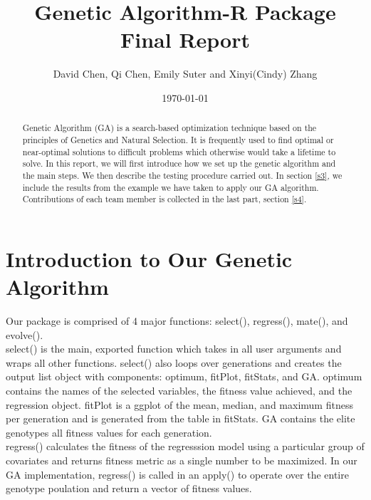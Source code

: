 \documentclass{article}
\begin{document}


\title{\LARGE Genetic Algorithm-R Package Final Report}
\author{David Chen, Qi Chen, Emily Suter and Xinyi(Cindy) Zhang}

\date{\today}

\maketitle

\begin{abstract}
Genetic Algorithm (GA) is a search-based optimization technique based on the principles of Genetics and Natural Selection. It is frequently used to find optimal or near-optimal solutions to difficult problems which otherwise would take a lifetime to solve. In this report, we will first introduce how we set up the genetic algorithm and the main steps. We then describe the testing procedure carried out. In section \ref{s3}, we include the results from the example we have taken to apply our GA algorithm. Contributions of each team member is collected in the last part, section \ref{s4}.
\end{abstract}

\newpage
\pagestyle{empty}

\section{Introduction to Our Genetic Algorithm}\label{s1}

Our package is comprised of 4 major functions: select(), regress(), mate(), and evolve().\\

select() is the main, exported function which takes in all user arguments and wraps all other functions. select() also loops over generations and creates the output list object with components: optimum, fitPlot, fitStats, and GA. optimum contains the names of the selected variables, the fitness value achieved, and the regression object. fitPlot is a ggplot of the mean, median, and maximum fitness per generation and is generated from the table in fitStats. GA contains the elite genotypes all fitness values  for each generation.\\

regress() calculates the fitness of the regresssion model using a particular group of covariates and returns fitness metric as a single number to be maximized. In our GA implementation, regress() is called in an apply() to operate over the entire genotype poulation and return a vector of fitness values.\\
\end{document}
